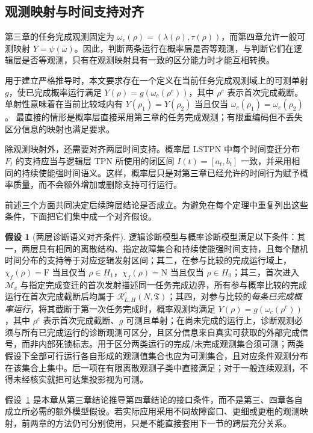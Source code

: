 \documentclass[master,fontset=ubuntu]{shnuthesis}
\theoremstyle{definition}
\newtheorem{thesisassumption}{假设}
\begin{document}
\subsection{观测映射与时间支持对齐}

第三章的任务完成观测固定为 \(\omega_c(\rho)=(\lambda(\rho),\tau(\rho))\)，而第四章允许一般可测映射 \(Y=\psi(\bar\omega)\)。因此，判断两条运行在概率层是否等观测，与判断它们在逻辑层是否等观测，只有在观测映射具有一致的区分能力时才能互相转换。

用于建立严格推导时，本文要求存在一个定义在当前任务完成观测域上的可测单射 \(g\)，使已完成概率运行满足 \(Y(\rho)=g(\omega_c(\rho^c))\)，其中 \(\rho^c\) 表示首次完成截断。单射性意味着在当前比较域内有
\(Y(\rho_1)=Y(\rho_2)\) 当且仅当
\(\omega_c(\rho_1)=\omega_c(\rho_2)\)。
最直接的情形是概率层直接采用第三章的任务完成观测；有限重编码但不丢失区分信息的映射也满足要求。

除观测映射外，还需要对齐两层时间支持。概率层 LSTPN 中每个时间变迁分布 \(F_t\) 的支持应当与逻辑层 TPN 所使用的闭区间 \(I(t)=[a_t,b_t]\) 一致，并采用相同的持续使能强时间语义。这样，概率层只是对第三章已经允许的时间行为赋予概率质量，而不会额外增加或删除支持可行运行。

前述三个方面共同决定后续跨层结论是否成立。为避免在每个定理中重复列出这些条件，下面把它们集中成一个对齐假设。

\begin{thesisassumption}[两层诊断语义对齐条件]
\label{ass:cross-layer-alignment}
逻辑诊断模型与概率诊断模型满足以下条件：其一，两层具有相同的离散结构、指定故障集合和持续使能强时间支持，且每个随机时间分布的支持等于对应逻辑发射区间；其二，在参与比较的完成运行域上，\(\chi_f(\rho)=\mathrm F\) 当且仅当 \(\rho\in H_1\)，\(\chi_f(\rho)=\mathrm N\) 当且仅当 \(\rho\in H_0\)；其三，首次进入 \(\mathcal M_c\) 与指定完成变迁的首次发射描述同一任务完成边界，所有参与概率比较的完成运行在首次完成截断后均属于 \(\mathcal R^c_{L,H}(N,\mathfrak T)\)；其四，对参与比较的\emph{每条已完成概率运行}，将其截断于第一次任务完成时，概率观测均满足 \(Y(\rho)=g(\omega_c(\rho^{c}))\)，其中 \(\rho^c\) 表示首次完成截断、\(g\) 可测且单射；在尚未完成的运行上，诊断观测必须与所有已完成运行的诊断观测可区分，且区分信息来自真实可获取的外部完成信号，而非内部死锁标志。用于区分两类运行的完成/未完成观测集合须可测；两类假设下全部可行运行各自形成的观测值集合也应为可测集合，且对应条件观测分布在该集合上集中。后一项在有限离散观测子类中直接满足；对于一般连续观测，不得未经核实就把可达集投影视为可测。
\end{thesisassumption}

假设~\ref{ass:cross-layer-alignment} 是本章从第三章结论推导第四章结论的接口条件，而不是第三、四章各自成立所必需的额外模型假设。若实际应用采用不同故障窗口、更细或更粗的观测映射，前两章的方法仍可分别使用，只是不能直接套用下一节的跨层充分关系。
\end{document}
